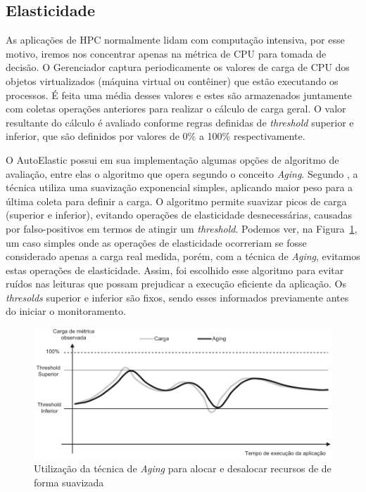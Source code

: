 \documentclass[twoside,english,brazilian]{UNISINOSartigo}
\begin{document}
\subsection{Elasticidade}
As aplicações de HPC normalmente lidam com computação intensiva, por esse motivo, iremos nos concentrar apenas na métrica de CPU para tomada de decisão. O Gerenciador captura periodicamente os valores de carga de CPU dos objetos virtualizados (máquina virtual ou contêiner) que estão executando os processos. É feita uma média desses valores e estes são armazenados juntamente com coletas operações anteriores para realizar o cálculo de carga geral. O valor resultante do cálculo é avaliado conforme regras definidas de \textit{threshold} superior e inferior, que são definidos por valores de 0\% a 100\% respectivamente. 


O AutoElastic possui em sua implementação algumas opções de algoritmo de avaliação, entre elas o algoritmo que opera segundo o conceito \textit{Aging}. Segundo , a técnica utiliza uma suavização exponencial simples, aplicando maior peso para a última coleta para definir a carga. O algoritmo permite suavizar picos de carga (superior e inferior), evitando operações de elasticidade desnecessárias, causadas por falso-positivos em termos de atingir um \textit{threshold}. Podemos ver, na Figura~\ref{fig:aging}, um caso simples onde as operações de elasticidade ocorreriam se fosse considerado apenas a carga real medida, porém, com a técnica de \textit{Aging}, evitamos estas operações de elasticidade. Assim, foi escolhido esse algoritmo para evitar ruídos nas leituras que possam prejudicar a execução eficiente da aplicação. Os \textit{thresolds} superior e inferior são fixos, sendo esses informados previamente antes do iniciar o monitoramento.

\begin{figure}
	\caption{Utilização da técnica de \textit{Aging} para alocar e desalocar recursos de de forma suavizada}
	\label{fig:aging}
	\centering%
	\vspace{-0.75\baselineskip}
	\begin{minipage}{0.75\textwidth}
		\includegraphics[width=\textwidth]{images/aging}
	\end{minipage}
\end{figure}
\end{document}
